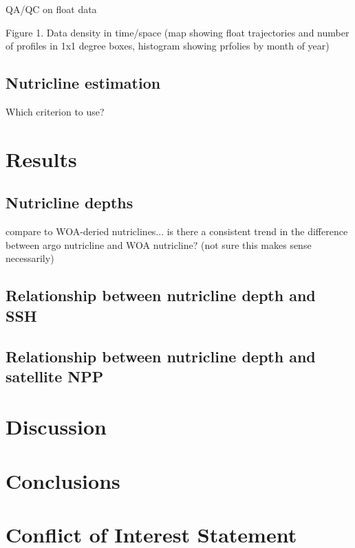 \documentclass[utf8]{frontiersSCNS} %
\begin{document}
QA/QC on float data \citep{maurer2021delayed}

Figure 1. Data density in time/space (map showing float trajectories and number of profiles in 1x1 degree boxes, histogram showing prfolies by month of year)

\subsection{Nutricline estimation}
Which criterion to use? 



\section{Results}
\subsection{Nutricline depths}
compare to WOA-deried nutriclines... is there a consistent trend in the difference between argo nutricline and WOA nutricline? (not sure this makes sense necessarily)

\subsection{Relationship between nutricline depth and SSH}

\subsection{Relationship between nutricline depth and satellite NPP}


\section{Discussion}


\section{Conclusions}


\section*{Conflict of Interest Statement}
\end{document}
